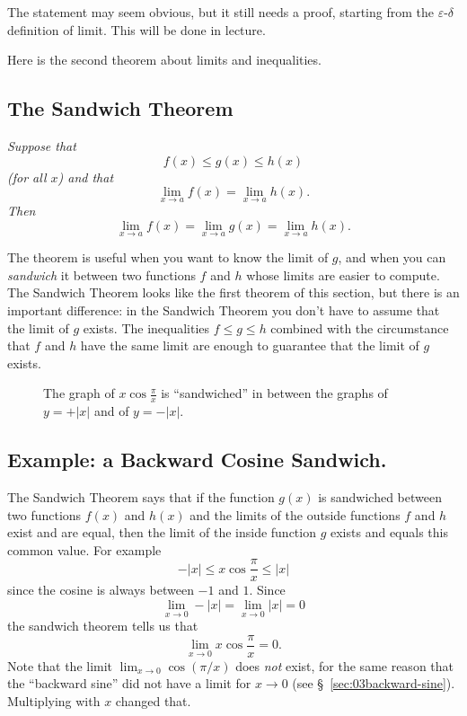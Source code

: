 The statement may seem obvious, but it still needs a proof, starting from
the $\varepsilon$-$\delta$ definition of limit.  This will be done in
lecture.

Here is the second theorem about limits and inequalities.

\subsection{The Sandwich Theorem}
\itshape
Suppose that
\[
f(x)\le g(x)\le h(x)
\]
(for all $x$) and that
\[
\lim_{x\to a} f(x)= \lim_{x\to a} h(x).
\]
Then
\[
\lim_{x\to a} f(x)= \lim_{x\to a} g(x)= \lim_{x\to a} h(x).
\]
\upshape


The theorem is useful when you want to know the limit of $g$, and when you
can \emph{sandwich} it between two functions $f$ and $h$ whose limits are
easier to compute.  The Sandwich Theorem looks like the first theorem of
this section, but there is an important difference: in the Sandwich Theorem
you don't have to assume that the limit of $g$ exists.  The inequalities
$f\leq g\leq h$ combined with the circumstance that $f$ and $h$ have the
same limit are enough to guarantee that the limit of $g$ exists.

\begin{figure}[h]\centering
  
  \caption{The graph of  $x\cos\frac\pi x$ is ``sandwiched'' in
    between the graphs of $y=+|x|$ and of $y=-|x|$.}
  \label{fig:03backwardCosSandwich}
\end{figure}

\subsection{Example: a Backward Cosine Sandwich. }
\label{sec:03xcos1overx} The Sandwich Theorem says that if the function
$g(x)$ is sandwiched between two functions $f(x)$ and $h(x)$ and the limits
of the outside functions $f$ and $h$ exist and are equal, then the limit of
the inside function $g$ exists and equals this common value.  For example
\[
-|x|\le x\cos\frac\pi x\le |x|
\]
since the cosine is always between $-1$ and $1$. Since
\[
\lim_{x\to 0}-|x|=\lim_{x\to 0}|x|=0
\]
the sandwich theorem tells us that
\[
\lim_{x\to 0} x\cos\frac\pi x =0.
\]
Note that the limit $ \lim_{x\to 0} \cos(\pi/x) $ does \emph{not}
exist, for the same reason that the ``backward sine'' did not have a
limit for $x\to0$ (see \S~\ref{sec:03backward-sine}).  Multiplying
with $x$ changed that.



